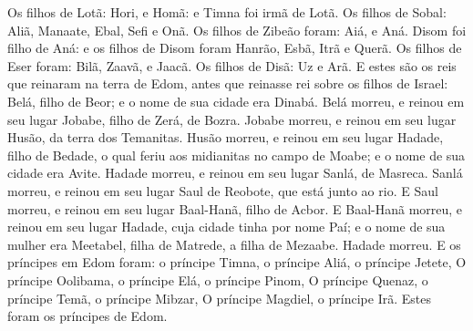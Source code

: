 {  Os filhos de Lotã: Hori, e Homã: e Timna foi irmã de Lotã.
  Os filhos de Sobal: Aliã, Manaate, Ebal, Sefi e Onã. Os filhos de Zibeão foram: Aiá, e Aná.
  Disom foi filho de Aná: e os filhos de Disom foram Hanrão, Esbã, Itrã e Querã.
  Os filhos de Eser foram: Bilã, Zaavã, e Jaacã. Os filhos de Disã: Uz e Arã.
  E estes são os reis que reinaram na terra de Edom, antes que reinasse
{} rei sobre os filhos de Israel: Belá, filho de Beor; e o nome de sua cidade era Dinabá.
  Belá morreu, e reinou em seu lugar Jobabe, filho de Zerá, de Bozra.
  Jobabe morreu, e reinou em seu lugar Husão, da terra dos Temanitas.
  Husão morreu, e reinou em seu lugar Hadade, filho de Bedade, o qual feriu aos midianitas no campo de Moabe; e o nome de sua cidade era Avite.
  Hadade morreu, e reinou em seu lugar Sanlá, de Masreca.
  Sanlá morreu, e reinou em seu lugar Saul de Reobote, que está junto ao rio.
  E Saul morreu, e reinou em seu lugar Baal-Hanã, filho de Acbor.
  E Baal-Hanã morreu, e reinou em seu lugar Hadade, cuja cidade tinha por nome Paí; e o nome de sua mulher era Meetabel, filha de Matrede, a filha de Mezaabe.
  Hadade morreu. E os príncipes em Edom foram: o príncipe Timna, o príncipe Aliá, o príncipe Jetete,
  O príncipe Oolibama, o príncipe Elá, o príncipe Pinom,
  O príncipe Quenaz, o príncipe Temã, o príncipe Mibzar,
  O príncipe Magdiel, o príncipe Irã. Estes foram os príncipes de Edom.
\par }

